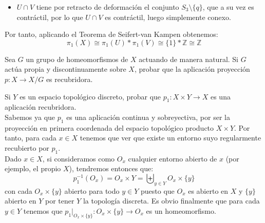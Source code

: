 \documentclass[12pt]{article}
\begin{document}
\begin{ejercicio}
\begin{enumerate}
\begin{itemize}
                    Por tanto, aplicando el Teorema de Seifert-van Kampen obtenemos:
                    \begin{equation*}
                        \pi_1(V)\cong \pi_1(Y) \cong \pi_1(W) \ast \pi_1(O) \cong \{1\} \ast \mathbb{Z} \cong \mathbb{Z}
                    \end{equation*}

                    Además, $Y$ es arcoconexo, pues $W$ y $O$ son arcoconexos y $W\cap O$ es no vacío. Por tanto, $V$ es arcoconexo y su grupo fundamental es isomorfo a $\mathbb{Z}$.

                    \item $U\cap V$ tiene por retracto de deformación el conjunto $S_3\setminus \{q\}$, que a su vez es contráctil, por lo que $U\cap V$ es contráctil, luego simplemente conexo.
                \end{itemize}

                Por tanto, aplicando el Teorema de Seifert-van Kampen obtenemos:
                \begin{equation*}
                    \pi_1(X)\cong \pi_1(U) \ast \pi_1(V) \cong \{1\}\ast \mathbb{Z} \cong \mathbb{Z}
                \end{equation*}
        \end{enumerate}
    \end{ejercicio}

    \begin{ejercicio}
        Sea $G$ un grupo de homeomorfismos de $X$ actuando de manera natural. Si $G$ actúa propia y discontinuamente sobre $X$, probar que la aplicación proyección $p:X\to X/G$ es recubridora.
    \end{ejercicio}

    \begin{ejercicio}
        Si $Y$ es un espacio topológico discreto, probar que $p_1:X\times Y\to X$ es una aplicación recubridora.\\
        
        Sabemos ya que $p_1$ es una aplicación continua y sobreyectiva, por ser la proyección en primera coordenada del espacio topológico producto $X\times Y$. Por tanto, para cada $x\in X$ tenemos que ver que existe un entorno suyo regularmente recubierto por $p_1$.\\
        
        Dado $x\in X$, si consideramos como $O_x$ cualquier entorno abierto de $x$ (por ejemplo, el propio $X$), tendremos entonces que:
        \begin{equation*}
            p_1^{-1}(O_x) = O_x\times Y = \biguplus_{y \in Y}O_x\times \{y\}
        \end{equation*}
        con cada $O_x\times \{y\}$ abierto para todo $y\in Y$ puesto que $O_x$ es abierto en $X$ y $\{y\}$ abierto en $Y$ por tener $Y$ la topología discreta. Es obvio finalmente que para cada $y\in Y$ tenemos que $p_1\big|_{O_x\times \{y\}}:O_x\times \{y\}\to O_x$ es un homeomorfismo.
    \end{ejercicio}
\end{document}
